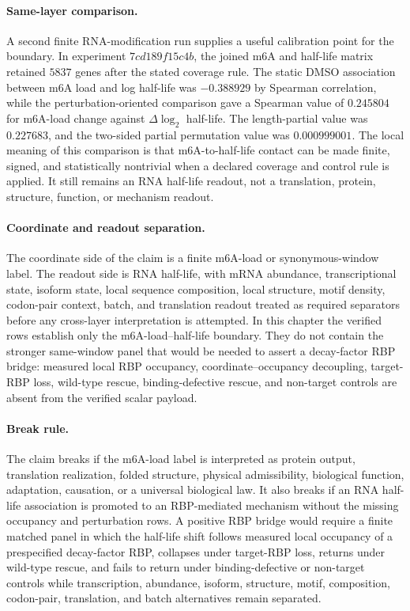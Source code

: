 \paragraph{Same-layer comparison.}
A second finite RNA-modification run supplies a useful calibration point for the boundary.  In experiment $7cd189f15c4b$, the joined m6A and half-life matrix retained $5837$ genes after the stated coverage rule.  The static DMSO association between m6A load and log half-life was $-0.388929$ by Spearman correlation, while the perturbation-oriented comparison gave a Spearman value of $0.245804$ for m6A-load change against $\Delta\log_2$ half-life.  The length-partial value was $0.227683$, and the two-sided partial permutation value was $0.000999001$.  The local meaning of this comparison is that m6A-to-half-life contact can be made finite, signed, and statistically nontrivial when a declared coverage and control rule is applied.  It still remains an RNA half-life readout, not a translation, protein, structure, function, or mechanism readout.

\paragraph{Coordinate and readout separation.}
The coordinate side of the claim is a finite m6A-load or synonymous-window label.  The readout side is RNA half-life, with mRNA abundance, transcriptional state, isoform state, local sequence composition, local structure, motif density, codon-pair context, batch, and translation readout treated as required separators before any cross-layer interpretation is attempted.  In this chapter the verified rows establish only the m6A-load--half-life boundary.  They do not contain the stronger same-window panel that would be needed to assert a decay-factor RBP bridge: measured local RBP occupancy, coordinate--occupancy decoupling, target-RBP loss, wild-type rescue, binding-defective rescue, and non-target controls are absent from the verified scalar payload.

\paragraph{Break rule.}
The claim breaks if the m6A-load label is interpreted as protein output, translation realization, folded structure, physical admissibility, biological function, adaptation, causation, or a universal biological law.  It also breaks if an RNA half-life association is promoted to an RBP-mediated mechanism without the missing occupancy and perturbation rows.  A positive RBP bridge would require a finite matched panel in which the half-life shift follows measured local occupancy of a prespecified decay-factor RBP, collapses under target-RBP loss, returns under wild-type rescue, and fails to return under binding-defective or non-target controls while transcription, abundance, isoform, structure, motif, composition, codon-pair, translation, and batch alternatives remain separated.

